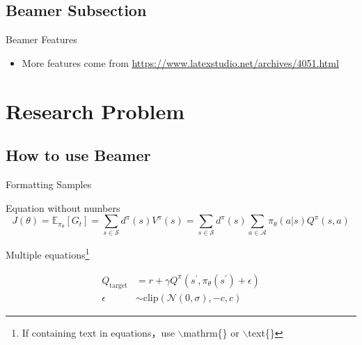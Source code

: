 \documentclass{beamer}
\begin{document}
\subsection{Beamer Subsection}

\begin{frame}{Beamer Features}
    \begin{itemize}
        \item More features come from  \url{https://www.latexstudio.net/archives/4051.html}
    \end{itemize}
\end{frame}

\section{Research Problem}

\subsection{}



\subsection{How to use Beamer}

\begin{frame}{Formatting Samples}
    \begin{exampleblock}{Equation without numbers} 
        \begin{equation*}
            J(\theta) = \mathbb{E}_{\pi_\theta}[G_t] = \sum_{s\in\mathcal{S}} d^\pi (s)V^\pi(s)=\sum_{s\in\mathcal{S}} d^\pi(s)\sum_{a\in\mathcal{A}}\pi_\theta(a|s)Q^\pi(s,a)
        \end{equation*}
    \end{exampleblock}
    \begin{exampleblock}{Multiple equations\footnote{If containing text in equations，use $\backslash$mathrm\{\} or $\backslash$text\{\}}}
       
        \begin{align}
            Q_\mathrm{target}&=r+\gamma Q^\pi(s^\prime, \pi_\theta(s^\prime)+\epsilon)\\
            \epsilon&\sim\mathrm{clip}(\mathcal{N}(0, \sigma), -c, c)\nonumber
        \end{align}
    \end{exampleblock}
\end{frame}
\end{document}
